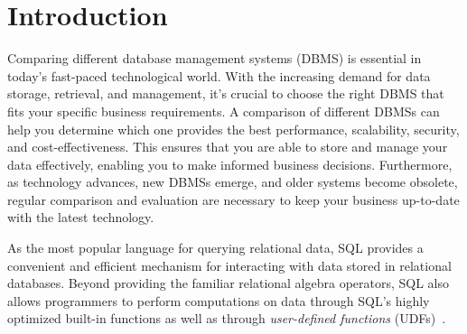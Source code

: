 \section{Introduction}
\label{sec:intro}

Comparing different database management systems (DBMS) is essential in today's fast-paced technological world. 
With the increasing demand for data storage, retrieval, and management, it's crucial to choose the right DBMS 
that fits your specific business requirements. A comparison of different DBMSs can help you determine which 
one provides the best performance, scalability, security, and cost-effectiveness. 
This ensures that you are able to store and manage your data effectively, enabling you to make informed 
business decisions. 
Furthermore, as technology advances, new DBMSs emerge, and older systems become obsolete, 
regular comparison and evaluation are necessary to keep your business up-to-date with the latest 
technology.

As the most popular language for querying relational data, SQL provides a convenient and efficient
mechanism for interacting with data stored in relational databases. Beyond providing the familiar
relational algebra operators, SQL also allows programmers to perform computations on data through 
SQL's highly optimized built-in functions as well as through \textit{user-defined functions} (UDFs)~\cite{ZC08}.



